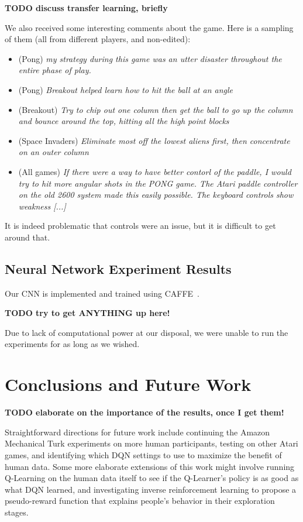 \documentclass[letterpaper, 10 pt, conference]{ieeeconf}  %
\begin{document}
\textbf{TODO discuss transfer learning, briefly}

We also received some interesting comments about the game. Here is a sampling of them (all from
different players, and non-edited):

\begin{itemize}
    \item (Pong) \emph{my strategy during this game was an utter disaster throughout the entire
    phase of play.}
    \item (Pong) \emph{Breakout helped learn how to hit the ball at an angle}
    \item (Breakout) \emph{Try to chip out one column then get the ball to go up the column and
    bounce around the top, hitting all the high point blocks}
    \item (Space Invaders) \emph{Eliminate most off the lowest aliens first, then concentrate on an
    outer column}
    \item (All games) \emph{If there were a way to have better contorl of the paddle, I would try to
    hit more angular shots in the PONG game. The Atari paddle controller on the old 2600 system made
    this easily possible. The keyboard controls show weakness [...]}
\end{itemize}

It is indeed problematic that controls were an issue, but it is difficult to get around that.

\subsection{Neural Network Experiment Results}\label{ssec:nn_results}

Our CNN is implemented and trained using CAFFE~\cite{caffe}.

\textbf{TODO try to get ANYTHING up here!}

Due to lack of computational power at our disposal, we were unable to run the experiments for as
long as we wished.


\section{Conclusions and Future Work}\label{sec:conclusions}

\textbf{TODO elaborate on the importance of the results, once I get them!} 

Straightforward directions for future work include continuing the Amazon Mechanical Turk experiments
on more human participants, testing on other Atari games, and identifying which DQN settings to use
to maximize the benefit of human data. Some more elaborate extensions of this work might involve
running Q-Learning on the human data itself to see if the Q-Learner's policy is as good as what DQN
learned, and investigating inverse reinforcement learning to propose a pseudo-reward function that
explains people's behavior in their exploration stages.
\end{document}
